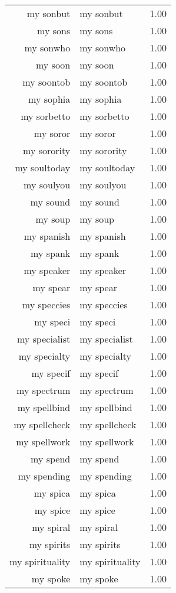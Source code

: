 \begin{table}[ht]
\begin{tabular}{rlr}
  my sonbut & my sonbut & 1.00 \\ 
  my sons & my sons & 1.00 \\ 
  my sonwho & my sonwho & 1.00 \\ 
  my soon & my soon & 1.00 \\ 
  my soontob & my soontob & 1.00 \\ 
  my sophia & my sophia & 1.00 \\ 
  my sorbetto & my sorbetto & 1.00 \\ 
  my soror & my soror & 1.00 \\ 
  my sorority & my sorority & 1.00 \\ 
  my soultoday & my soultoday & 1.00 \\ 
  my soulyou & my soulyou & 1.00 \\ 
  my sound & my sound & 1.00 \\ 
  my soup & my soup & 1.00 \\ 
  my spanish & my spanish & 1.00 \\ 
  my spank & my spank & 1.00 \\ 
  my speaker & my speaker & 1.00 \\ 
  my spear & my spear & 1.00 \\ 
  my speccies & my speccies & 1.00 \\ 
  my speci & my speci & 1.00 \\ 
  my specialist & my specialist & 1.00 \\ 
  my specialty & my specialty & 1.00 \\ 
  my specif & my specif & 1.00 \\ 
  my spectrum & my spectrum & 1.00 \\ 
  my spellbind & my spellbind & 1.00 \\ 
  my spellcheck & my spellcheck & 1.00 \\ 
  my spellwork & my spellwork & 1.00 \\ 
  my spend & my spend & 1.00 \\ 
  my spending & my spending & 1.00 \\ 
  my spica & my spica & 1.00 \\ 
  my spice & my spice & 1.00 \\ 
  my spiral & my spiral & 1.00 \\ 
  my spirits & my spirits & 1.00 \\ 
  my spirituality & my spirituality & 1.00 \\ 
  my spoke & my spoke & 1.00 \\ 

\end{tabular}
\end{table}
